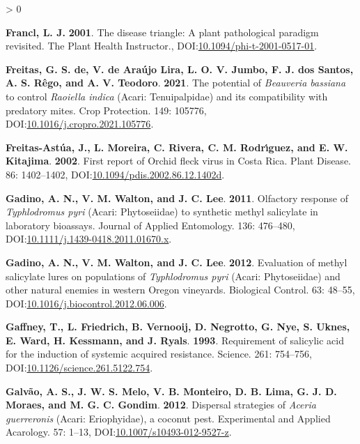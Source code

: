 \documentclass{ufdissertation}[overrideChapters] %
\newlength{\cslhangindent}
\newenvironment{CSLReferences}[2] %
 {%
  \setlength{\parindent}{0pt}
  \ifodd #1 \everypar{\setlength{\hangindent}{\cslhangindent}}\ignorespaces\fi
  \ifnum #2 > 0
  \setlength{\parskip}{#2\baselineskip}
  \fi
 }%
 {}
\begin{document}
{\begin{CSLReferences}{1}{1}
\leavevmode{}%
\textbf{Francl, L. J.} \textbf{2001}. The disease triangle: A plant pathological paradigm revisited. The Plant Health Instructor., DOI:\href{https://doi.org/10.1094/phi-t-2001-0517-01}{10.1094/phi-t-2001-0517-01}.

\leavevmode{}%
\textbf{Freitas, G. S. de, V. de Araújo Lira, L. O. V. Jumbo, F. J. dos Santos, A. S. Rêgo, and A. V. Teodoro}. \textbf{2021}. The potential of {\emph{Beauveria bassiana}} to control {\emph{Raoiella indica}} ({Acari}: {Tenuipalpidae}) and its compatibility with predatory mites. Crop Protection. 149: 105776, DOI:\href{https://doi.org/10.1016/j.cropro.2021.105776}{10.1016/j.cropro.2021.105776}.

\leavevmode{}%
\textbf{Freitas-Astúa, J., L. Moreira, C. Rivera, C. M. Rodrı́guez, and E. W. Kitajima}. \textbf{2002}. First report of {Orchid fleck virus} in {Costa Rica}. Plant Disease. 86: 1402--1402, DOI:\href{https://doi.org/10.1094/pdis.2002.86.12.1402d}{10.1094/pdis.2002.86.12.1402d}.

\leavevmode{}%
\textbf{Gadino, A. N., V. M. Walton, and J. C. Lee}. \textbf{2011}. Olfactory response of {\emph{Typhlodromus pyri}} {({Acari}: {Phytoseiidae})} to synthetic methyl salicylate in laboratory bioassays. Journal of Applied Entomology. 136: 476--480, DOI:\href{https://doi.org/10.1111/j.1439-0418.2011.01670.x}{10.1111/j.1439-0418.2011.01670.x}.

\leavevmode{}%
\textbf{Gadino, A. N., V. M. Walton, and J. C. Lee}. \textbf{2012}. Evaluation of methyl salicylate lures on populations of {\emph{Typhlodromus pyri}} {({Acari}: {Phytoseiidae})} and other natural enemies in western {Oregon} vineyards. Biological Control. 63: 48--55, DOI:\href{https://doi.org/10.1016/j.biocontrol.2012.06.006}{10.1016/j.biocontrol.2012.06.006}.

\leavevmode{}%
\textbf{Gaffney, T., L. Friedrich, B. Vernooij, D. Negrotto, G. Nye, S. Uknes, E. Ward, H. Kessmann, and J. Ryals}. \textbf{1993}. Requirement of salicylic acid for the induction of systemic acquired resistance. Science. 261: 754--756, DOI:\href{https://doi.org/10.1126/science.261.5122.754}{10.1126/science.261.5122.754}.

\leavevmode{}%
\textbf{Galvão, A. S., J. W. S. Melo, V. B. Monteiro, D. B. Lima, G. J. D. Moraes, and M. G. C. Gondim}. \textbf{2012}. Dispersal strategies of {\emph{Aceria guerreronis}} ({Acari}: {Eriophyidae}), a coconut pest. Experimental and Applied Acarology. 57: 1--13, DOI:\href{https://doi.org/10.1007/s10493-012-9527-z}{10.1007/s10493-012-9527-z}.


\end{CSLReferences}}
\end{document}
